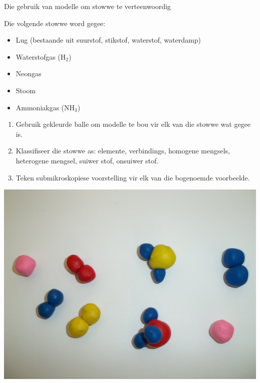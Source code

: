 \vspace{-1cm}
  \label{m38708*eip-326}
\begin{activity}{Die gebruik van modelle om stowwe te verteenwoordig}{
\begin{minipage}{.5\textwidth}
Die volgende stowwe word gegee:
\label{m38708*eip-id1166921187210}
\begin{itemize}[noitemsep]
\item Lug (bestaande uit suurstof, stikstof, waterstof, waterdamp)
\item Waterstofgas ($\text{H}_{2}$)
\item Neongas
\item Stoom
\item Ammoniakgas ($\text{NH}_{3}$)
\end{itemize}
\noindent
\begin{enumerate}[noitemsep, label=\textbf{\arabic*}.]
\item Gebruik gekleurde balle om modelle te bou vir elk van die stowwe wat gegee is.
\item Klassifiseer die stowwe as: elemente, verbindings, homogene mengsels, heterogene mengsel, suiwer stof, onsuiwer stof.
\item Teken submikroskopiese voorstelling vir elk van die bogenoemde voorbeelde.
\end{enumerate}
\end{minipage}
\begin{minipage}{.5\textwidth}
\begin{center}
 \includegraphics[width=.8\textwidth]{photos/models_classification.jpg}\par
\end{center}
\end{minipage}
}
\end{activity}
